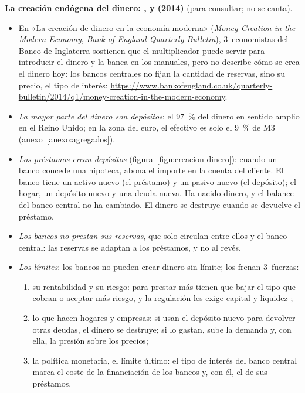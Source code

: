 \documentclass[11pt]{article}
\begin{document}
\begin{anotaciones}
\textbf{La creación endógena del dinero: ,  y  (2014)} (para consultar; no se canta).
\begin{itemize}
\item En «La creación de dinero en la economía moderna» (\emph{Money Creation in the Modern Economy}, \emph{Bank of England Quarterly Bulletin}), 3~economistas del Banco de Inglaterra sostienen que el multiplicador puede servir para introducir el dinero y la banca en los manuales, pero no describe cómo se crea el dinero hoy: los bancos centrales no fijan la cantidad de reservas, sino su precio, el tipo de interés\nocite{McLeayRadiaThomas2014Money}: \url{https://www.bankofengland.co.uk/quarterly-bulletin/2014/q1/money-creation-in-the-modern-economy}.
\item \emph{La mayor parte del dinero son depósitos}: el 97~\% del dinero en sentido amplio en el Reino Unido\nocite{McLeayRadiaThomas2014Money}; en la zona del euro, el efectivo es solo el 9~\% de M3\nocite{BCE2026BSI} (anexo~\ref{anexo:agregados}).
\item \emph{Los préstamos crean depósitos} (figura~\ref{figu:creacion-dinero}): cuando un banco concede una hipoteca, abona el importe en la cuenta del cliente. El banco tiene un activo nuevo (el préstamo) y un pasivo nuevo (el depósito); el hogar, un depósito nuevo y una deuda nueva. Ha nacido dinero, y el balance del banco central no ha cambiado. El dinero se destruye cuando se devuelve el préstamo.
\item \emph{Los bancos no prestan sus reservas}, que solo circulan entre ellos y el banco central: las reservas se adaptan a los préstamos, y no al revés.
\item \emph{Los límites}: los bancos no pueden crear dinero sin límite; los frenan 3~fuerzas:
  \begin{enumerate}
  \item su rentabilidad y su riesgo: para prestar más tienen que bajar el tipo que cobran o aceptar más riesgo, y la regulación les exige capital y liquidez ;
  \item lo que hacen hogares y empresas: si usan el depósito nuevo para devolver otras deudas, el dinero se destruye; si lo gastan, sube la demanda y, con ella, la presión sobre los precios;
  \item la política monetaria, el límite último: el tipo de interés del banco central marca el coste de la financiación de los bancos y, con él, el de sus préstamos.

\end{enumerate}
\end{itemize}
\end{anotaciones}
\end{document}
